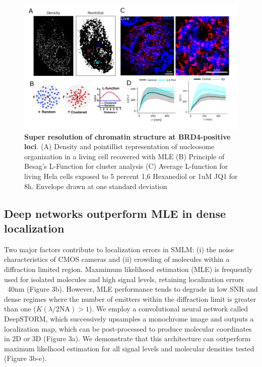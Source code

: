 \documentclass{ucetd}
\begin{document}
\begin{figure}
\begin{center}
\includegraphics[width=13cm]{BRD4-Results.png}
\end{center}
\caption{\textbf{Super resolution of chromatin structure at BRD4-positive loci}. (A) Density and pointillist representation of nucleosome organization in a living cell recovered with MLE (B) Principle of Besag's L-Function for cluster analysis (C) Average L-function for living Hela cells exposed to 5 percent 1,6 Hexanediol or 1uM JQ1 for 8h. Envelope drawn at one standard deviation}
\end{figure}

\subsection{Deep networks outperform MLE in dense localization}

Two major factors contribute to localization errors in SMLM: (i) the noise characteristics of CMOS cameras and (ii) crowding of molecules within a diffraction limited region. Maxmimum likelihood estimation (MLE) is frequently used for isolated molecules and high signal levels, retaining localization errors ~40nm (Figure 3b). However, MLE performance tends to degrade in low SNR and dense regimes where the number of emitters within the diffraction limit is greater than one ($K(\lambda/2\mathrm{NA}) > 1$). We employ a convolutional neural network called DeepSTORM, which successively upsamples a monochrome image and outputs a localization map, which can be post-processed to produce molecular coordinates in 2D or 3D (Figure 3a).  We demonstrate that this architecture can outperform maximum likelhood estimation for all signal levels and molecular densities tested (Figure 3b-e).
\end{document}
